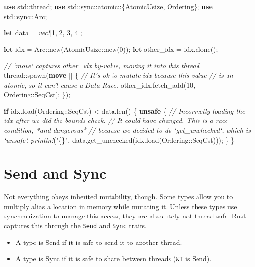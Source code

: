 \documentclass[a4paper,]{book}
\newenvironment{Shaded}{\begin{snugshade}}{\end{snugshade}}
\newcommand{\KeywordTok}[1]{\textcolor[rgb]{0.13,0.29,0.53}{\textbf{{#1}}}}
\newcommand{\DecValTok}[1]{\textcolor[rgb]{0.00,0.00,0.81}{{#1}}}
\newcommand{\StringTok}[1]{\textcolor[rgb]{0.31,0.60,0.02}{{#1}}}
\newcommand{\CommentTok}[1]{\textcolor[rgb]{0.56,0.35,0.01}{\textit{{#1}}}}
\newcommand{\PreprocessorTok}[1]{\textcolor[rgb]{0.56,0.35,0.01}{\textit{{#1}}}}
\newcommand{\NormalTok}[1]{{#1}}
\providecommand{\tightlist}{%
  \setlength{\itemsep}{0pt}\setlength{\parskip}{0pt}}
\begin{document}
\begin{Shaded}
\begin{Highlighting}[]
\KeywordTok{use} \NormalTok{std::thread;}
\KeywordTok{use} \NormalTok{std::sync::atomic::\{AtomicUsize, Ordering\};}
\KeywordTok{use} \NormalTok{std::sync::Arc;}

\KeywordTok{let} \NormalTok{data = }\PreprocessorTok{vec!}\NormalTok{[}\DecValTok{1}\NormalTok{, }\DecValTok{2}\NormalTok{, }\DecValTok{3}\NormalTok{, }\DecValTok{4}\NormalTok{];}

\KeywordTok{let} \NormalTok{idx = Arc::new(AtomicUsize::new(}\DecValTok{0}\NormalTok{));}
\KeywordTok{let} \NormalTok{other_idx = idx.clone();}

\CommentTok{// `move` captures other_idx by-value, moving it into this thread}
\NormalTok{thread::spawn(}\KeywordTok{move} \NormalTok{|| \{}
    \CommentTok{// It's ok to mutate idx because this value}
    \CommentTok{// is an atomic, so it can't cause a Data Race.}
    \NormalTok{other_idx.fetch_add(}\DecValTok{10}\NormalTok{, Ordering::SeqCst);}
\NormalTok{\});}

\KeywordTok{if} \NormalTok{idx.load(Ordering::SeqCst) < data.len() \{}
    \KeywordTok{unsafe} \NormalTok{\{}
        \CommentTok{// Incorrectly loading the idx after we did the bounds check.}
        \CommentTok{// It could have changed. This is a race condition, *and dangerous*}
        \CommentTok{// because we decided to do `get_unchecked`, which is `unsafe`.}
        \PreprocessorTok{println!}\NormalTok{(}\StringTok{"\{\}"}\NormalTok{, data.get_unchecked(idx.load(Ordering::SeqCst)));}
    \NormalTok{\}}
\NormalTok{\}}
\end{Highlighting}
\end{Shaded}

\section{Send and Sync}\label{sec--send-and-sync}

Not everything obeys inherited mutability, though. Some types allow you
to multiply alias a location in memory while mutating it. Unless these
types use synchronization to manage this access, they are absolutely not
thread safe. Rust captures this through the \texttt{Send} and
\texttt{Sync} traits.

\begin{itemize}
\tightlist
\item
  A type is Send if it is safe to send it to another thread.
\item
  A type is Sync if it is safe to share between threads (\texttt{\&T} is
  Send).
\end{itemize}
\end{document}
